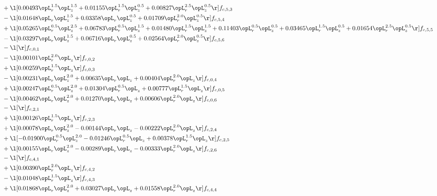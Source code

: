 \begin{alignat}{2}
& + \l[  0.00493 \opL_r^{1.5} \opL_z^{1.5} +  0.01155 \opL_r^{1.5} \opL_z^{0.5} +  0.00827 \opL_r^{2.5} \opL_z^{0.5}  \r] f_{c,5,3} \nonumber \\ 
& - \l[  0.01648 \opL_r \opL_z^{1.5} +  0.03358 \opL_r \opL_z^{0.5} +  0.01709 \opL_r^{2.0} \opL_z^{0.5}  \r] f_{c,5,4} \nonumber \\ 
& + \l[  0.05265 \opL_r^{0.5} \opL_z^{2.5} +  0.06783 \opL_r^{0.5} \opL_z^{1.5} +  0.01480 \opL_r^{1.5} \opL_z^{1.5} +  0.11403 \opL_r^{0.5} \opL_z^{0.5} +  0.03465 \opL_r^{1.5} \opL_z^{0.5} +  0.01654 \opL_r^{2.5} \opL_z^{0.5}  \r] f_{c,5,5} \nonumber \\ 
& - \l[  0.03297 \opL_r \opL_z^{1.5} +  0.06716 \opL_r \opL_z^{0.5} +  0.02564 \opL_r^{2.0} \opL_z^{0.5}  \r] f_{c,5,6} \nonumber \\ 
& - \l[  \r] f_{c,0,1} \nonumber \\ 
& - \l[  0.00101 \opL_r^{2.0} \opL_z  \r] f_{c,0,2} \nonumber \\ 
& + \l[  0.00259 \opL_r^{1.5} \opL_z  \r] f_{c,0,3} \nonumber \\ 
& - \l[  0.00231 \opL_r \opL_z^{2.0} +  0.00635 \opL_r \opL_z +  0.00404 \opL_r^{2.0} \opL_z  \r] f_{c,0,4} \nonumber \\ 
& + \l[  0.00247 \opL_r^{0.5} \opL_z^{2.0} +  0.01304 \opL_r^{0.5} \opL_z +  0.00777 \opL_r^{1.5} \opL_z  \r] f_{c,0,5} \nonumber \\ 
& - \l[  0.00462 \opL_r \opL_z^{2.0} +  0.01270 \opL_r \opL_z +  0.00606 \opL_r^{2.0} \opL_z  \r] f_{c,0,6} \nonumber \\ 
& - \l[  \r] f_{c,2,1} \nonumber \\ 
& + \l[  0.00126 \opL_r^{1.5} \opL_z  \r] f_{c,2,3} \nonumber \\ 
& + \l[  0.00078 \opL_r \opL_z^{2.0}   -0.00144 \opL_r \opL_z   -0.00222 \opL_r^{2.0} \opL_z  \r] f_{c,2,4} \nonumber \\ 
& + \l[  -0.01900 \opL_r^{0.5} \opL_z^{2.0}   -0.01246 \opL_r^{0.5} \opL_z +  0.00378 \opL_r^{1.5} \opL_z  \r] f_{c,2,5} \nonumber \\ 
& + \l[  0.00155 \opL_r \opL_z^{2.0}   -0.00289 \opL_r \opL_z   -0.00333 \opL_r^{2.0} \opL_z  \r] f_{c,2,6} \nonumber \\ 
& - \l[  \r] f_{c,4,1} \nonumber \\ 
& + \l[  0.00390 \opL_r^{2.0} \opL_z  \r] f_{c,4,2} \nonumber \\ 
& - \l[  0.01048 \opL_r^{1.5} \opL_z  \r] f_{c,4,3} \nonumber \\ 
& + \l[  0.01868 \opL_r \opL_z^{2.0} +  0.03027 \opL_r \opL_z +  0.01558 \opL_r^{2.0} \opL_z  \r] f_{c,4,4} \nonumber \\ 

\end{alignat}
